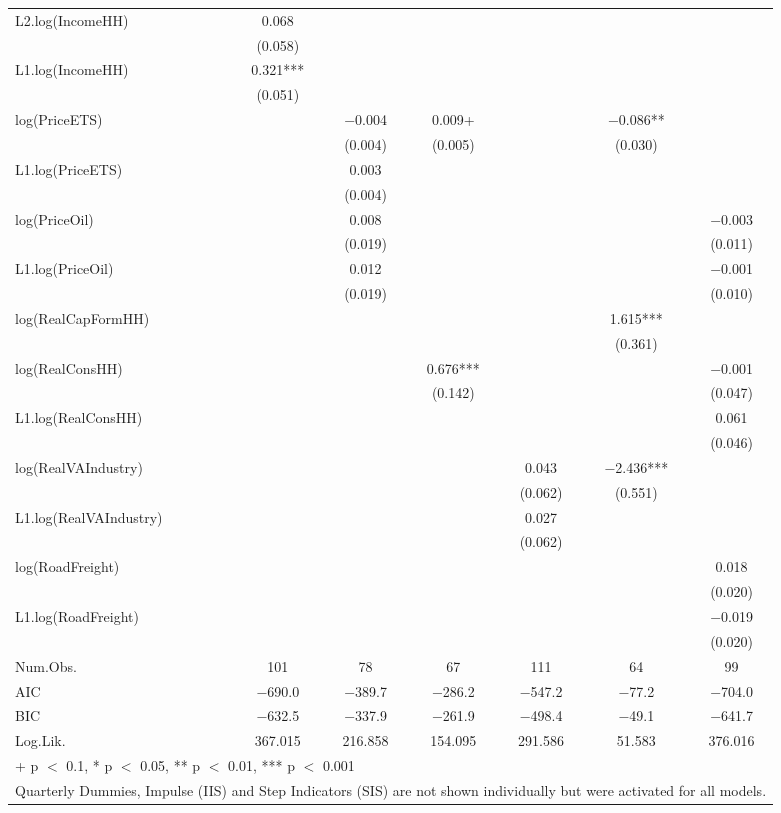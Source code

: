 \begin{table}
{\begin{tabular}[t]{lcccccc}
L2.log(IncomeHH) & \num{0.068} &  &  &  &  & \\
 & (\num{0.058}) &  &  &  &  & \\
L1.log(IncomeHH) & \num{0.321}*** &  &  &  &  & \\
 & (\num{0.051}) &  &  &  &  & \\
log(PriceETS) &  & \num{-0.004} & \num{0.009}+ &  & \num{-0.086}** & \\
 &  & (\num{0.004}) & (\num{0.005}) &  & (\num{0.030}) & \\
L1.log(PriceETS) &  & \num{0.003} &  &  &  & \\
 &  & (\num{0.004}) &  &  &  & \\
log(PriceOil) &  & \num{0.008} &  &  &  & \num{-0.003}\\
 &  & (\num{0.019}) &  &  &  & (\num{0.011})\\
L1.log(PriceOil) &  & \num{0.012} &  &  &  & \num{-0.001}\\
 &  & (\num{0.019}) &  &  &  & (\num{0.010})\\
log(RealCapFormHH) &  &  &  &  & \num{1.615}*** & \\
 &  &  &  &  & (\num{0.361}) & \\
log(RealConsHH) &  &  & \num{0.676}*** &  &  & \num{-0.001}\\
 &  &  & (\num{0.142}) &  &  & (\num{0.047})\\
L1.log(RealConsHH) &  &  &  &  &  & \num{0.061}\\
 &  &  &  &  &  & (\num{0.046})\\
log(RealVAIndustry) &  &  &  & \num{0.043} & \num{-2.436}*** & \\
 &  &  &  & (\num{0.062}) & (\num{0.551}) & \\
L1.log(RealVAIndustry) &  &  &  & \num{0.027} &  & \\
 &  &  &  & (\num{0.062}) &  & \\
log(RoadFreight) &  &  &  &  &  & \num{0.018}\\
 &  &  &  &  &  & \vphantom{1} (\num{0.020})\\
L1.log(RoadFreight) &  &  &  &  &  & \num{-0.019}\\
 &  &  &  &  &  & (\num{0.020})\\
\midrule
Num.Obs. & \num{101} & \num{78} & \num{67} & \num{111} & \num{64} & \num{99}\\
AIC & \num{-690.0} & \num{-389.7} & \num{-286.2} & \num{-547.2} & \num{-77.2} & \num{-704.0}\\
BIC & \num{-632.5} & \num{-337.9} & \num{-261.9} & \num{-498.4} & \num{-49.1} & \num{-641.7}\\
Log.Lik. & \num{367.015} & \num{216.858} & \num{154.095} & \num{291.586} & \num{51.583} & \num{376.016}\\
\bottomrule
\multicolumn{7}{l}{\rule{0pt}{1em}+ p $<$ 0.1, * p $<$ 0.05, ** p $<$ 0.01, *** p $<$ 0.001}\\
\multicolumn{7}{l}{\rule{0pt}{1em}Quarterly Dummies, Impulse (IIS) and Step Indicators (SIS) are not shown individually but were activated for all models.}\\
\end{tabular}}
\end{table}
